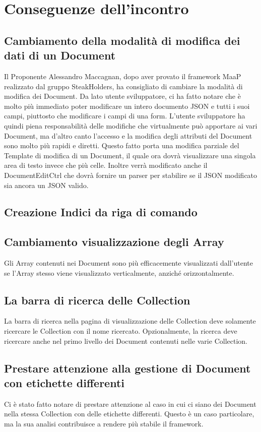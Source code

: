 \newpage
\section{Conseguenze dell'incontro}
\label{2}

\subsection{Cambiamento della modalità di modifica dei dati di un Document}
Il Proponente Alessandro Maccagnan, dopo aver provato il framework MaaP realizzato dal gruppo SteakHolders, 
ha consigliato di cambiare la modalità di modifica dei Document.
Da lato utente sviluppatore, ci ha fatto notare che è molto più immediato poter modificare un intero documento 
JSON e tutti i suoi campi, piuttosto che modificare i campi di una form. 
L'utente sviluppatore ha quindi piena responsabilità delle modifiche che virtualmente può apportare ai vari Document, 
ma d'altro canto l'accesso e la modifica degli attributi del Document sono molto più rapidi e diretti.
Questo fatto porta una modifica parziale del Template di modifica di un Document, il quale ora dovrà visualizzare una singola
area di testo invece che più celle. Inoltre verrà modificato anche il DocumentEditCtrl che dovrà fornire un parser per stabilire 
se il JSON modificato sia ancora un JSON valido.

\subsection{Creazione Indici da riga di comando}

\subsection{Cambiamento visualizzazione degli Array}
Gli Array contenuti nei Document sono più efficacemente visualizzati dall'utente se l'Array stesso viene visualizzato verticalmente,
anziché orizzontalmente.

\subsection{La barra di ricerca delle Collection}
La barra di ricerca nella pagina di visualizzazione delle Collection deve solamente ricercare le Collection con il nome ricercato.
Opzionalmente, la ricerca deve ricercare anche nel primo livello dei Document contenuti nelle varie Collection. 

\subsection{Prestare attenzione alla gestione di Document con etichette differenti}
Ci è stato fatto notare di prestare attenzione al caso in cui ci siano dei Document nella stessa Collection con delle etichette 
differenti. Questo è un caso particolare, ma la sua analisi contribuisce a rendere più stabile il framework.

